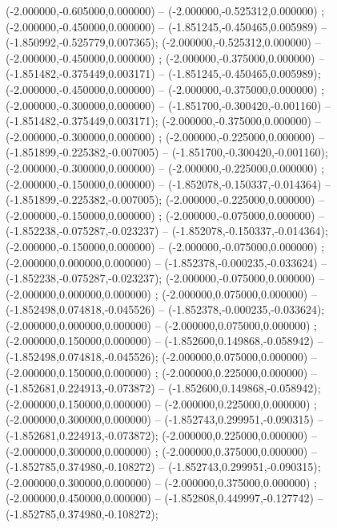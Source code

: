  (-2.000000,-0.605000,0.000000) -- (-2.000000,-0.525312,0.000000) ;
 (-2.000000,-0.450000,0.000000) -- (-1.851245,-0.450465,0.005989) -- (-1.850992,-0.525779,0.007365);
 (-2.000000,-0.525312,0.000000) -- (-2.000000,-0.450000,0.000000) ;
 (-2.000000,-0.375000,0.000000) -- (-1.851482,-0.375449,0.003171) -- (-1.851245,-0.450465,0.005989);
 (-2.000000,-0.450000,0.000000) -- (-2.000000,-0.375000,0.000000) ;
 (-2.000000,-0.300000,0.000000) -- (-1.851700,-0.300420,-0.001160) -- (-1.851482,-0.375449,0.003171);
 (-2.000000,-0.375000,0.000000) -- (-2.000000,-0.300000,0.000000) ;
 (-2.000000,-0.225000,0.000000) -- (-1.851899,-0.225382,-0.007005) -- (-1.851700,-0.300420,-0.001160);
 (-2.000000,-0.300000,0.000000) -- (-2.000000,-0.225000,0.000000) ;
 (-2.000000,-0.150000,0.000000) -- (-1.852078,-0.150337,-0.014364) -- (-1.851899,-0.225382,-0.007005);
 (-2.000000,-0.225000,0.000000) -- (-2.000000,-0.150000,0.000000) ;
 (-2.000000,-0.075000,0.000000) -- (-1.852238,-0.075287,-0.023237) -- (-1.852078,-0.150337,-0.014364);
 (-2.000000,-0.150000,0.000000) -- (-2.000000,-0.075000,0.000000) ;
 (-2.000000,0.000000,0.000000) -- (-1.852378,-0.000235,-0.033624) -- (-1.852238,-0.075287,-0.023237);
 (-2.000000,-0.075000,0.000000) -- (-2.000000,0.000000,0.000000) ;
 (-2.000000,0.075000,0.000000) -- (-1.852498,0.074818,-0.045526) -- (-1.852378,-0.000235,-0.033624);
 (-2.000000,0.000000,0.000000) -- (-2.000000,0.075000,0.000000) ;
 (-2.000000,0.150000,0.000000) -- (-1.852600,0.149868,-0.058942) -- (-1.852498,0.074818,-0.045526);
 (-2.000000,0.075000,0.000000) -- (-2.000000,0.150000,0.000000) ;
 (-2.000000,0.225000,0.000000) -- (-1.852681,0.224913,-0.073872) -- (-1.852600,0.149868,-0.058942);
 (-2.000000,0.150000,0.000000) -- (-2.000000,0.225000,0.000000) ;
 (-2.000000,0.300000,0.000000) -- (-1.852743,0.299951,-0.090315) -- (-1.852681,0.224913,-0.073872);
 (-2.000000,0.225000,0.000000) -- (-2.000000,0.300000,0.000000) ;
 (-2.000000,0.375000,0.000000) -- (-1.852785,0.374980,-0.108272) -- (-1.852743,0.299951,-0.090315);
 (-2.000000,0.300000,0.000000) -- (-2.000000,0.375000,0.000000) ;
 (-2.000000,0.450000,0.000000) -- (-1.852808,0.449997,-0.127742) -- (-1.852785,0.374980,-0.108272);
